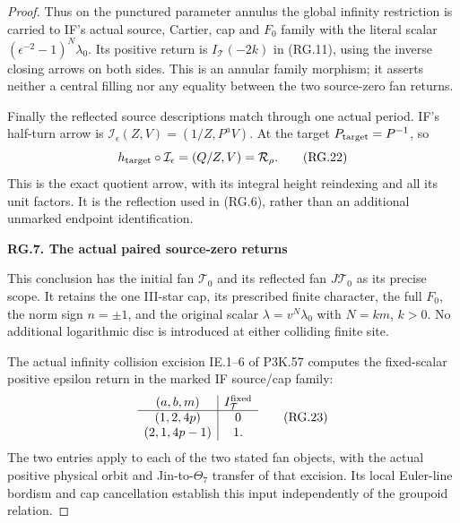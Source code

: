 \begin{proof}
Thus on the punctured parameter annulus the global
infinity restriction is carried to IF's actual source,
Cartier, cap and \(F_0\) family with the literal scalar
\((\epsilon^{-2}-1)^N\lambda_0\). Its positive return
is \(I_{\mathcal T}(-2k)\) in (RG.11), using the inverse
closing arrows on both sides. This is an annular family
morphism; it asserts neither a central filling nor
any equality between the two source-zero fan returns.

Finally the reflected source descriptions match through
one actual period. IF's half-turn arrow is
\(\mathcal I_\epsilon(Z,V)=(1/Z,P^aV)\).
At the target \(P_{\rm target}=P^{-1}\), so
\[
        h_{\rm target}\circ\mathcal I_\epsilon
                  =(Q/Z,V)=\mathcal R_\rho .
                                                        \tag{RG.22}
\]
This is the exact quotient arrow, with its integral
height reindexing and all its unit factors. It is the
reflection used in (RG.6), rather than an additional
unmarked endpoint identification.

\par

\medskip\noindent\textbf{RG.7. The actual paired source-zero returns}

\par\nobreak

This conclusion has the initial fan \(\mathcal T_0\) and
its reflected fan \(J\mathcal T_0\) as its precise scope.
It retains the one III-star cap, its prescribed finite
character, the full \(F_0\), the norm sign \(n=\pm1\),
and the original scalar
\(\lambda=v^N\lambda_0\) with \(N=km\), \(k>0\).
No additional logarithmic disc is introduced at either
colliding finite site.

The actual infinity collision excision IE.1--6 of
P3K.57 computes the fixed-scalar positive epsilon
return in the marked IF source/cap family:
\[
 \begin{array}{c|c}
 (a,b,m)&I^{\rm fixed}_{\mathcal T}\\ \hline
 (1,2,4p)&0\\
 (2,1,4p-1)&1 .
 \end{array}                                            \tag{RG.23}
\]
The two entries apply to each of the two stated fan
objects, with the actual positive physical orbit and
Jin-to-\(\Theta_7\) transfer of that excision. Its local
Euler-line bordism and cap cancellation establish this
input independently of the groupoid relation.


\end{proof}
